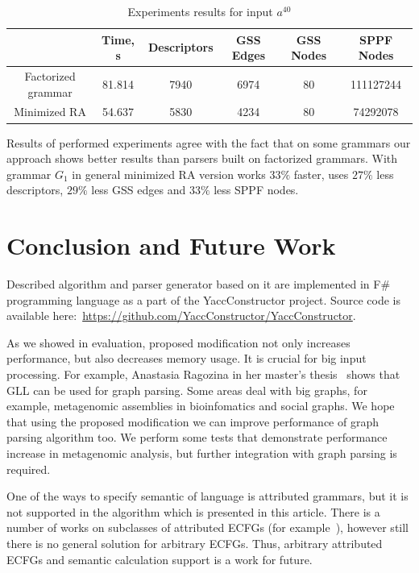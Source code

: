 \documentclass[runningheads,a4paper]{llncs}
\begin{document}
\begin{table}[ht]   
\begin{center}
    \begin{tabular}{ | c | c | c | c | c | c | }
        \hline
                           & Time, s & Descriptors & GSS Edges & GSS Nodes & SPPF Nodes   \\ \hline
        Factorized grammar & 81.814  & 7940        & 6974      & 80        & 111127244  \\ \hline
        Minimized RA       & 54.637  & 5830        & 4234      & 80        & 74292078  \\ \hline
    \end{tabular}
\end{center}
\caption{Experiments results for input $a^{40}$}
\label{expTable}
\end{table}



Results of performed experiments agree with the fact that on some grammars our approach 
shows better results than parsers built on factorized grammars.
With grammar $G_1$ in general minimized RA version works $33\%$ faster, uses $27\%$ less descriptors, $29\%$ less GSS edges
and $33\%$ less SPPF nodes.

\section{Conclusion and Future Work}

Described algorithm and parser generator based on it are implemented in F\# programming language as a part of the YaccConstructor project.
Source code is available here:~\url{https://github.com/YaccConstructor/YaccConstructor}.

As we showed in evaluation, proposed modification not only increases performance, but also decreases memory usage. 
It is crucial for big input processing.
For example, Anastasia Ragozina in her master's thesis~\cite{ragozina} shows that GLL can be used for graph parsing.  
Some areas deal with big graphs, for example, metagenomic assemblies in bioinfomatics and social graphs.
We hope that using the proposed modification we can improve performance of graph parsing algorithm too. 
We perform some tests that demonstrate performance increase in metagenomic analysis, but further integration with graph parsing is required.

One of the ways to specify semantic of language is attributed grammars, but it is not supported in the algorithm which is presented in this article.
There is a number of works on subclasses of attributed ECFGs (for example~\cite{AttributedELL}), however still there is no general solution for arbitrary ECFGs.
Thus, arbitrary attributed ECFGs and semantic calculation support is a work for future.
\end{document}
